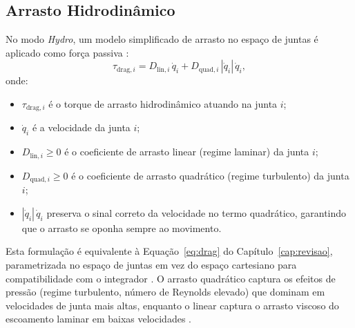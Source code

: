\subsection{Arrasto Hidrodinâmico}

No modo \textit{Hydro}, um modelo simplificado de arrasto no espaço de juntas é aplicado como força passiva \cite{fossen2011handbook, antonelli2014modelling}:
\begin{equation}
    \tau_{\text{drag},i} = D_{\text{lin},i}\,\dot{q}_i + D_{\text{quad},i}\,|\dot{q}_i|\,\dot{q}_i,
    \label{eq:drag_impl}
\end{equation}
onde:
\begin{itemize}
    \item $\tau_{\text{drag},i}$ é o torque de arrasto hidrodinâmico atuando na junta $i$;
    \item $\dot{q}_i$ é a velocidade da junta $i$;
    \item $D_{\text{lin},i} \geq 0$ é o coeficiente de arrasto linear (regime laminar) da junta $i$;
    \item $D_{\text{quad},i} \geq 0$ é o coeficiente de arrasto quadrático (regime turbulento) da junta $i$;
    \item $|\dot{q}_i|\,\dot{q}_i$ preserva o sinal correto da velocidade no termo quadrático, garantindo que o arrasto se oponha sempre ao movimento.
\end{itemize} Esta formulação é equivalente à Equação~\eqref{eq:drag} do Capítulo~\ref{cap:revisao}, parametrizada no espaço de juntas em vez do espaço cartesiano para compatibilidade com o integrador \cite{antonelli2014modelling}. O arrasto quadrático captura os efeitos de pressão (regime turbulento, número de Reynolds elevado) que dominam em velocidades de junta mais altas, enquanto o linear captura o arrasto viscoso do escoamento laminar em baixas velocidades \cite{fossen2011handbook, newman1977marine}.

